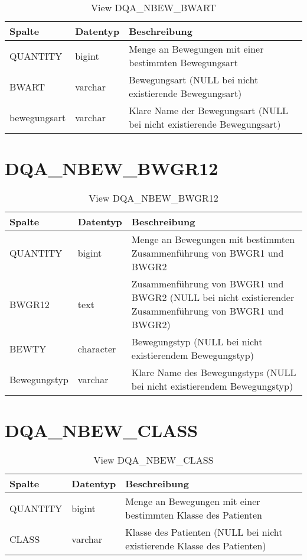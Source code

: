   \begin{table}[ht]
    \centering
    \caption{View DQA\_NBEW\_BWART}
    \label{tab:dqanbewbwart}
    \begin{tabular}{||l|l|p{10cm}||}
      \hline
      Spalte & Datentyp & Beschreibung \\ [0.5ex] \hline \hline
QUANTITY & bigint & Menge an Bewegungen mit einer bestimmten Bewegungsart \\ \hline
BWART & varchar & Bewegungsart (NULL bei nicht existierende Bewegungsart)\\ \hline
bewegungsart & varchar & Klare Name der Bewegungsart (NULL bei nicht existierende Bewegungsart)\\ \hline
    \end{tabular}
  \end{table}
 \clearpage
  \section{DQA\_NBEW\_BWGR12}

  \begin{table}[ht]
    \centering
    \caption{View DQA\_NBEW\_BWGR12}
    \label{tab:dqanbewbwgr12}
    \begin{tabular}{||l|l|p{10cm}||}
      \hline
      Spalte & Datentyp & Beschreibung \\ [0.5ex] \hline \hline
QUANTITY & bigint & Menge an Bewegungen mit bestimmten Zusammenführung von BWGR1 und BWGR2 \\ \hline
BWGR12 & text & Zusammenführung von BWGR1 und BWGR2 (NULL bei nicht existierender Zusammenführung von BWGR1 und BWGR2)\\ \hline
BEWTY & character & Bewegungstyp (NULL bei nicht existierendem Bewegungstyp)\\ \hline
Bewegungstyp & varchar & Klare Name des Bewegungstyps (NULL bei nicht existierendem Bewegungstyp)\\ \hline
    \end{tabular}
  \end{table}
  \section{DQA\_NBEW\_CLASS}

  \begin{table}[ht]
    \centering
    \caption{View DQA\_NBEW\_CLASS}
    \label{tab:dqanbewclass}
    \begin{tabular}{||l|l|p{10cm}||}
      \hline
      Spalte & Datentyp & Beschreibung \\ [0.5ex] \hline \hline
QUANTITY & bigint & Menge an Bewegungen mit einer bestimmten Klasse des Patienten \\ \hline
CLASS & varchar & Klasse des Patienten (NULL bei nicht existierende Klasse des Patienten)\\ \hline
    \end{tabular}
  \end{table}
 \clearpage
